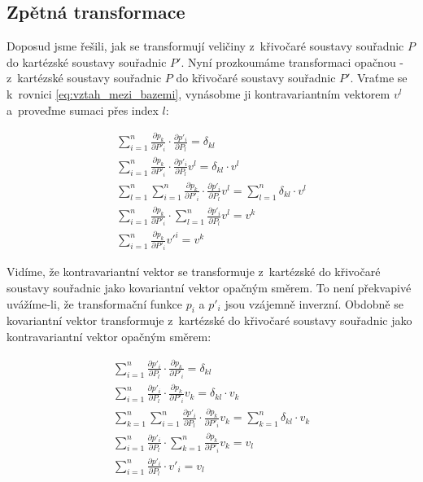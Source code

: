 \subsection{Zpětná transformace}

Doposud jsme řešili, jak se transformují veličiny z~křivočaré soustavy souřadnic \(P\) do kartézské soustavy souřadnic \(P'\). Nyní prozkoumáme transformaci opačnou - z~kartézské soustavy souřadnic \(P\) do křivočaré soustavy souřadnic \(P'\).
Vraťme se k~rovnici \eqref{eq:vztah_mezi_bazemi}, vynásobme ji kontravariantním vektorem \(v^l\) a~proveďme sumaci přes index \(l\):
 
\begin{equation}
\label{eq:transformace_kontravariantniho_vektoru_z_kartezske_soustavy}
\begin{split}
\sum_{i=1}^n \frac{\partial p_k}{\partial P'_i} \cdot \frac{\partial p'_i}{\partial P_l} = \delta_{kl} \\
\sum_{i=1}^n \frac{\partial p_k}{\partial P'_i} \cdot \frac{\partial p'_i}{\partial P_l} v^l = \delta_{kl} \cdot v^l \\
\sum_{l=1}^n \sum_{i=1}^n \frac{\partial p_k}{\partial P'_i} \cdot \frac{\partial p'_i}{\partial P_l} v^l = \sum_{l=1}^n \delta_{kl} \cdot v^l \\
\sum_{i=1}^n \frac{\partial p_k}{\partial P'_i} \cdot \sum_{l=1}^n \frac{\partial p'_i}{\partial P_l} v^l = v^k \\
\sum_{i=1}^n \frac{\partial p_k}{\partial P'_i} v'^i = v^k
\end{split}
\end{equation}

Vidíme, že kontravariantní vektor se transformuje z~kartézské do křivočaré soustavy souřadnic jako kovariantní vektor opačným směrem. To není překvapivé uvážíme-li, že transformační funkce \(p_i\) a \(p'_i\) jsou vzájemně inverzní. Obdobně se kovariantní vektor transformuje z~kartézské do křivočaré soustavy souřadnic jako kontravariantní vektor opačným směrem:

\begin{equation}
\label{eq:transformace_kovariantniho_vektoru_z_kartezske_soustavy}
\begin{split}
\sum_{i=1}^n \frac{\partial p'_i}{\partial P_l} \cdot \frac{\partial p_k}{\partial P'_i} = \delta_{kl} \\
\sum_{i=1}^n \frac{\partial p'_i}{\partial P_l} \cdot \frac{\partial p_k}{\partial P'_i} v_k = \delta_{kl} \cdot v_k \\
\sum_{k=1}^n \sum_{i=1}^n \frac{\partial p'_i}{\partial P_l} \cdot \frac{\partial p_k}{\partial P'_i} v_k = \sum_{k=1}^n \delta_{kl} \cdot v_k \\
\sum_{i=1}^n \frac{\partial p'_i}{\partial P_l} \cdot \sum_{k=1}^n \frac{\partial p_k}{\partial P'_i} v_k = v_l \\
\sum_{i=1}^n \frac{\partial p'_i}{\partial P_l} \cdot v'_i = v_l \\
\end{split}
\end{equation}

